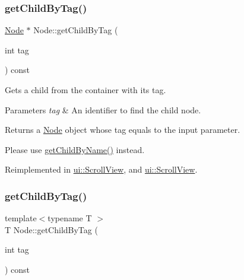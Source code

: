 \subsubsection{\texorpdfstring{get\+Child\+By\+Tag()}{getChildByTag()}\hspace{0.1cm}{\footnotesize\ttfamily [1/4]}}
{\footnotesize\ttfamily \hyperlink{classNode}{Node} $\ast$ Node\+::get\+Child\+By\+Tag (\begin{DoxyParamCaption}\item[{int}]{tag }\end{DoxyParamCaption}) const\hspace{0.3cm}{\ttfamily [virtual]}}

Gets a child from the container with its tag.


\begin{DoxyParams}{Parameters}
{\em tag} & An identifier to find the child node.\\
\hline
\end{DoxyParams}
\begin{DoxyReturn}{Returns}
a \hyperlink{classNode}{Node} object whose tag equals to the input parameter.
\end{DoxyReturn}
Please use {\ttfamily \hyperlink{classNode_ac2f84f995c7d6581787abaa3b09c4518}{get\+Child\+By\+Name()}} instead. 

Reimplemented in \hyperlink{classui_1_1ScrollView_a0b4781b276e8040776a7ec93eb54792e}{ui\+::\+Scroll\+View}, and \hyperlink{classui_1_1ScrollView_a0c523b2f58f7916aa9aaf7bcab4781a7}{ui\+::\+Scroll\+View}.

\mbox{\label{classNode_a093e82df91d1c2df7d55e5b1b319012b}} 
\subsubsection{\texorpdfstring{get\+Child\+By\+Tag()}{getChildByTag()}\hspace{0.1cm}{\footnotesize\ttfamily [2/4]}}
{\footnotesize\ttfamily template$<$typename T $>$ \\
T Node\+::get\+Child\+By\+Tag (\begin{DoxyParamCaption}\item[{int}]{tag }\end{DoxyParamCaption}) const\hspace{0.3cm}{\ttfamily [inline]}}

